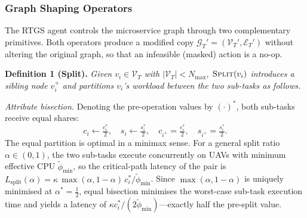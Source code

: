 %

\subsubsection{Graph Shaping Operators}
\label{subsubsec:operators}

The RTGS agent controls the microservice graph through two complementary
primitives.
Both operators produce a modified copy
$\mathcal{G}_T' = (\mathcal{V}_T',\mathcal{E}_T')$
without altering the original graph,
so that an infeasible (masked) action is a no-op.

\smallskip
\noindent\textbf{Definition 1 (Split).}
\emph{Given $v_i \in \mathcal{V}_T$ with $|\mathcal{V}_T| < N_{\max}$,
$\textsc{Split}(v_i)$ introduces a sibling node $v_i^{+}$ and
partitions $v_i$'s workload between the two sub-tasks as follows.}

\smallskip
\noindent\textit{Attribute bisection.}
Denoting the pre-operation values by $(\cdot)^*$, both sub-tasks
receive equal shares:
\begin{equation}
  c_i \leftarrow \tfrac{c_i^*}{2},\quad
  s_i \leftarrow \tfrac{s_i^*}{2},\quad
  c_{i^+} = \tfrac{c_i^*}{2},\quad
  s_{i^+} = \tfrac{s_i^*}{2}.
  \label{eq:split_attr}
\end{equation}
The equal partition is optimal in a minimax sense.
For a general split ratio $\alpha \in (0,1)$, the two sub-tasks execute
concurrently on UAVs with minimum effective CPU $\tilde\phi_{\min}$,
so the critical-path latency of the pair is
$L_{\mathrm{split}}(\alpha)
= \kappa\,\max(\alpha,1-\alpha)\,c_i^*/\tilde\phi_{\min}$.
Since $\max(\alpha,1-\alpha)$ is uniquely minimised at $\alpha^*=\tfrac{1}{2}$,
equal bisection minimises the worst-case sub-task execution time
and yields a latency of $\kappa c_i^*/(2\tilde\phi_{\min})$—exactly
half the pre-split value.

